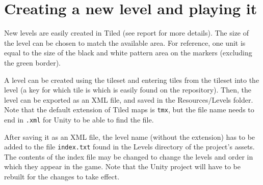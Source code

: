 \documentclass{report}
\begin{document}
\section*{Creating a new level and playing it}
	New levels are easily created in Tiled (see report for more details). The size 
	of the level can be chosen to match the available area. For reference, one unit
	is equal to the size of the black and white pattern area on the markers (excluding 
	the green border).  
	
	A level can be created using the tileset and entering tiles 
	from the tileset into the level (a key for which tile is which is easily found 
	on the repository). Then, the level can be exported as an XML file, and saved 
	in the Resources/Levels folder. Note that the default extension of Tiled maps is
	\texttt{tmx}, but the file name needs to end in \texttt{.xml} for Unity to be able
	to find the file.
	
	After saving it as an XML file, the level name (without the extension)
	has to be added to the file \texttt{index.txt} found in the Levels directory of 
	the project's assets. The contents of the index file may be changed to 
	change the levels and order in which they appear in the game. Note that the Unity
	project will have to be rebuilt for the changes to take effect.
\end{document}
